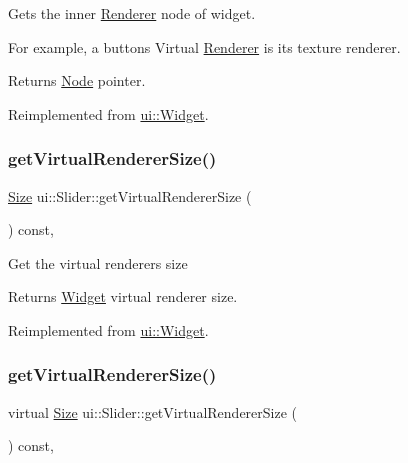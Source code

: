 Gets the inner \hyperlink{classRenderer}{Renderer} node of widget.

For example, a button\textquotesingle{}s Virtual \hyperlink{classRenderer}{Renderer} is it\textquotesingle{}s texture renderer.

\begin{DoxyReturn}{Returns}
\hyperlink{classNode}{Node} pointer. 
\end{DoxyReturn}


Reimplemented from \hyperlink{classui_1_1Widget_acf862bf9235fbb3823819eeb65d46f25}{ui\+::\+Widget}.

\mbox{\label{classui_1_1Slider_a70a4f1507c4a95f317368512098959da}} 
\subsubsection{\texorpdfstring{get\+Virtual\+Renderer\+Size()}{getVirtualRendererSize()}\hspace{0.1cm}{\footnotesize\ttfamily [1/2]}}
{\footnotesize\ttfamily \hyperlink{classSize}{Size} ui\+::\+Slider\+::get\+Virtual\+Renderer\+Size (\begin{DoxyParamCaption}{ }\end{DoxyParamCaption}) const\hspace{0.3cm}{\ttfamily [override]}, {\ttfamily [virtual]}}

Get the virtual renderer\textquotesingle{}s size \begin{DoxyReturn}{Returns}
\hyperlink{classui_1_1Widget}{Widget} virtual renderer size. 
\end{DoxyReturn}


Reimplemented from \hyperlink{classui_1_1Widget_a2ed0d41565593f78dc59c975d58a869e}{ui\+::\+Widget}.

\mbox{\label{classui_1_1Slider_ab49069835dfbf66b2e5a2e6c99050bf6}} 
\subsubsection{\texorpdfstring{get\+Virtual\+Renderer\+Size()}{getVirtualRendererSize()}\hspace{0.1cm}{\footnotesize\ttfamily [2/2]}}
{\footnotesize\ttfamily virtual \hyperlink{classSize}{Size} ui\+::\+Slider\+::get\+Virtual\+Renderer\+Size (\begin{DoxyParamCaption}{ }\end{DoxyParamCaption}) const\hspace{0.3cm}{\ttfamily [override]}, {\ttfamily [virtual]}}

